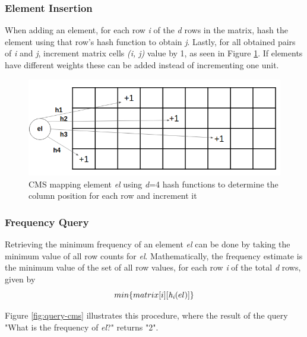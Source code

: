\subsubsection*{Element Insertion}
When adding an element, for each row \textit{i} of the \textit{d} rows in the matrix, hash the element using that row's hash function to obtain \textit{j}. Lastly, for all obtained pairs of \textit{i} and \textit{j}, increment matrix cells \textit{(i, j)} value by 1, as seen in Figure \ref{fig:cms}. If elements have different weights these can be added instead of incrementing one unit.

\begin{figure}[!htb]
    \begin{center}
      \includegraphics[scale=0.5]{figures/insertion-cms.png}
      \caption[Count-Min Sketch insertion]{CMS mapping element \textit{el} using \textit{d}=4 hash functions to determine the column position for each row and increment it}
      \label{fig:cms}
    \end{center}
\end{figure}

\subsubsection*{Frequency Query}
Retrieving the minimum frequency of an element \textit{el} can be done by taking the minimum value of all row counts for \textit{el}. Mathematically, the frequency estimate is the minimum value of the set of all row values, for each row \textit{i} of the total \textit{d} rows, given by
\[ min \{matrix[i][\textit{h\textsubscript{i}}(el)]\} \]

Figure \ref{fig:query-cms} illustrates this procedure, where the result of the query "What is the frequency of \textit{el}?" returns "2".
   
